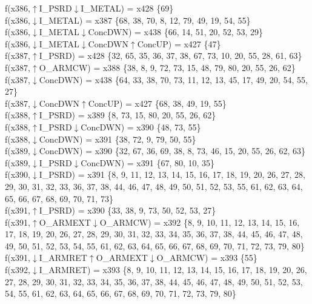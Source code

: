 f(x386,$\uparrow$I\_PSRD$\downarrow$I\_METAL) = x428 \{69\} \\  
f(x386,$\downarrow$I\_METAL) = x387 \{68, 38, 70, 8, 12, 79, 49, 19, 54, 55\} \\  
f(x386,$\downarrow$I\_METAL$\downarrow$ConcDWN) = x438 \{66, 14, 51, 20, 52, 53, 29\} \\  
f(x386,$\downarrow$I\_METAL$\downarrow$ConcDWN$\uparrow$ConcUP) = x427 \{47\} \\  
f(x387,$\uparrow$I\_PSRD) = x428 \{32, 65, 35, 36, 37, 38, 67, 73, 10, 20, 55, 28, 61, 63\} \\  
f(x387,$\uparrow$O\_ARMCW) = x388 \{38, 8, 9, 72, 73, 15, 48, 79, 80, 20, 55, 26, 62\} \\  
f(x387,$\downarrow$ConcDWN) = x438 \{64, 33, 38, 70, 73, 11, 12, 13, 45, 17, 49, 20, 54, 55, 27\} \\  
f(x387,$\downarrow$ConcDWN$\uparrow$ConcUP) = x427 \{68, 38, 49, 19, 55\} \\  
f(x388,$\uparrow$I\_PSRD) = x389 \{8, 73, 15, 80, 20, 55, 26, 62\} \\  
f(x388,$\uparrow$I\_PSRD$\downarrow$ConcDWN) = x390 \{48, 73, 55\} \\  
f(x388,$\downarrow$ConcDWN) = x391 \{38, 72, 9, 79, 50, 55\} \\  
f(x389,$\downarrow$ConcDWN) = x390 \{32, 67, 36, 69, 38, 8, 73, 46, 15, 20, 55, 26, 62, 63\} \\  
f(x389,$\downarrow$I\_PSRD$\downarrow$ConcDWN) = x391 \{67, 80, 10, 35\} \\  
f(x390,$\downarrow$I\_PSRD) = x391 \{8, 9, 11, 12, 13, 14, 15, 16, 17, 18, 19, 20, 26, 27, 28, 29, 30, 31, 32, 33, 36, 37, 38, 44, 46, 47, 48, 49, 50, 51, 52, 53, 55, 61, 62, 63, 64, 65, 66, 67, 68, 69, 70, 71, 73\} \\  
f(x391,$\uparrow$I\_PSRD) = x390 \{33, 38, 9, 73, 50, 52, 53, 27\} \\  
f(x391,$\uparrow$O\_ARMEXT$\downarrow$O\_ARMCW) = x392 \{8, 9, 10, 11, 12, 13, 14, 15, 16, 17, 18, 19, 20, 26, 27, 28, 29, 30, 31, 32, 33, 34, 35, 36, 37, 38, 44, 45, 46, 47, 48, 49, 50, 51, 52, 53, 54, 55, 61, 62, 63, 64, 65, 66, 67, 68, 69, 70, 71, 72, 73, 79, 80\} \\  
f(x391,$\downarrow$I\_ARMRET$\uparrow$O\_ARMEXT$\downarrow$O\_ARMCW) = x393 \{55\} \\  
f(x392,$\downarrow$I\_ARMRET) = x393 \{8, 9, 10, 11, 12, 13, 14, 15, 16, 17, 18, 19, 20, 26, 27, 28, 29, 30, 31, 32, 33, 34, 35, 36, 37, 38, 44, 45, 46, 47, 48, 49, 50, 51, 52, 53, 54, 55, 61, 62, 63, 64, 65, 66, 67, 68, 69, 70, 71, 72, 73, 79, 80\} \\  
